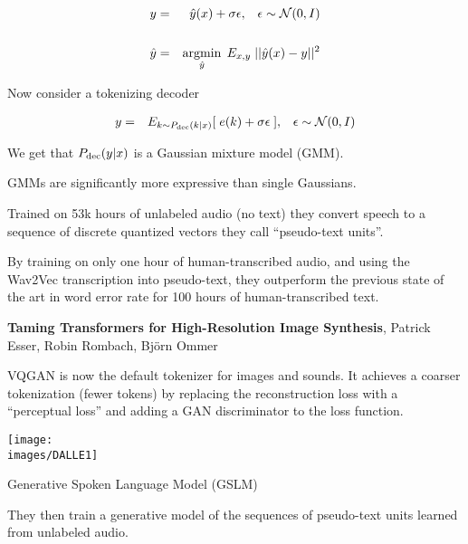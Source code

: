 {{{{\begin{eqnarray*}
y & = & \hat{y}(x) + \sigma \epsilon,\;\;\;\epsilon \sim {\cal N}(0,I) \\
\\
\hat{y} & = & \operatorname*{argmin}_{\hat{y}}\; E_{x,y}\;||\hat{y}(x)-y||^2
\end{eqnarray*}


Now consider a tokenizing decoder

\begin{eqnarray*}
y & = & E_{k\sim P_{\mathrm{dec}}(k|x)}[\; e(k) + \sigma \epsilon\;],\;\;\;\epsilon \sim {\cal N}(0,I) \\
\end{eqnarray*}

We get that $P_{\mathrm{dec}}(y|x)$ is a Gaussian mixture model (GMM).

\vfill
GMMs are significantly more expressive than single Gaussians.

\vfill


\vfill
Trained on 53k hours of unlabeled audio (no text) they convert speech to a sequence of discrete quantized vectors they call ``pseudo-text units''.

\vfill
By training on only one hour of human-transcribed audio, and using the Wav2Vec transcription into pseudo-text, they outperform the previous state of the
art in word error rate for 100 hours of human-transcribed text.


{\bf Taming Transformers for High-Resolution Image Synthesis},
Patrick Esser, Robin Rombach, Björn Ommer

\vfill
VQGAN is now the default tokenizer for images and sounds.  It achieves a coarser tokenization (fewer tokens) by replacing the reconstruction loss with a ``perceptual loss'' and adding a GAN discriminator to the loss function. 


\vfill
\centerline{\texttt{[image: \\images/DALLE1]}}



Generative Spoken Language Model (GSLM)

\vfill
They then train a generative model of the sequences of pseudo-text units learned from unlabeled audio.


}}}}

